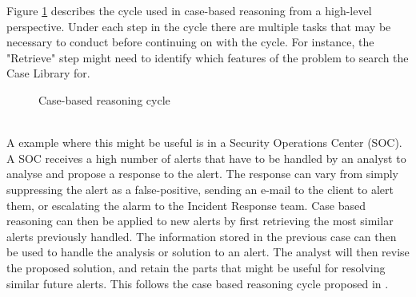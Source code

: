 Figure \ref{fig:case-based-reasoning-cycle} describes the cycle used in case-based reasoning from a high-level perspective.
Under each step in the cycle there are multiple tasks that may be necessary to conduct before continuing on with the cycle. For instance, the "Retrieve" step might need to identify which features of the problem to search the Case Library for.
\begin{figure}[ht]
\centering
\caption{Case-based reasoning cycle}
\label{fig:case-based-reasoning-cycle}
\end{figure}\\
A example where this might be useful is in a Security Operations Center (SOC). A SOC receives a high number of alerts that have to be handled by an analyst to analyse and propose a response to the alert. The response can vary from simply suppressing the alert as a false-positive, sending an e-mail to the client to alert them, or escalating the alarm to the Incident Response team. Case based reasoning can then be applied to new alerts by first retrieving the most similar alerts previously handled. The information stored in the previous case can then be used to handle the analysis or solution to an alert. The analyst will then revise the proposed solution, and retain the parts that might be useful for resolving similar future alerts. This follows the case based reasoning cycle proposed in \cite{aamodt_1994}.
